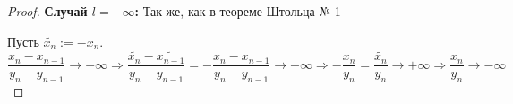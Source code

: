 \begin{proof}
    \textbf{Случай $l = -\infty$:}
    Так же, как в теореме Штольца № 1

    Пусть $\widetilde{x_n} := -x_n$.
    \[\frac{x_n - x_{n-1}}{y_n - y_{n - 1}} \rightarrow -\infty
    \Rightarrow \frac{\widetilde{x_n} - \widetilde{x_{n-1}}}
    {y_n - y_{n - 1}} = -\frac{x_n - x_{n-1}}{y_n - y_{n - 1}}
    \rightarrow +\infty \Rightarrow -\frac{x_n}{y_n} =
    \frac{\widetilde{x_n}}{y_n} \rightarrow +\infty
    \Rightarrow \frac{x_n}{y_n} \rightarrow -\infty\] 

\end{proof}